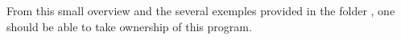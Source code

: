 \documentclass{article}
\begin{document}
From this small overview and the several exemples provided in the folder , one should be able to take ownership of this program.



\nocite{*}

 
%
\end{document}
